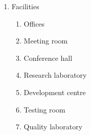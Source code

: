 \begin{enumerate}[label*=\arabic*.]
	\item Facilities
		\begin{enumerate}[label*=\arabic*.]
		\item Offices
		\item Meeting room
		\item Conference hall
		\item Research laboratory
		\item Development centre
		\item Testing room
		\item Quality laboratory
		\end{enumerate}
	
\end{enumerate}